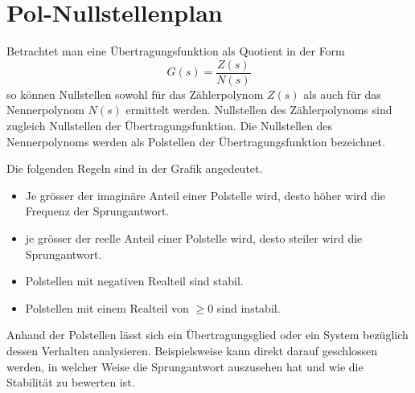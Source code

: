 \section{Pol-Nullstellenplan}
Betrachtet man eine Übertragungsfunktion als Quotient in der Form
\[  
    G(s) = \frac{Z(s)}{N(s)}
\]
so können Nullstellen sowohl für das Zählerpolynom $Z(s)$ als auch 
für das Nennerpolynom $N(s)$ ermittelt werden. Nullstellen des 
Zählerpolynoms sind zugleich Nullstellen der Übertragungsfunktion.
Die Nullstellen des Nennerpolynoms werden als Polstellen der
Übertragungsfunktion bezeichnet.
%
\begin{figure}[h!]
    \centering
\end{figure}
%
Die folgenden Regeln sind in der Grafik angedeutet.
\begin{itemize}
    \item Je grösser der imaginäre Anteil einer Polstelle wird, desto
        höher wird die Frequenz der Sprungantwort.
    \item je grösser der reelle Anteil einer Polstelle wird, desto
        steiler wird die Sprungantwort.
    \item Polstellen mit negativen Realteil sind stabil.
    \item Polstellen mit einem Realteil von $\geq 0$ sind instabil.
\end{itemize}
%
Anhand der Polstellen lässt sich ein Übertragungsglied oder ein System 
bezüglich dessen Verhalten analysieren. Beispielsweise kann direkt darauf
geschlossen werden, in welcher Weise die Sprungantwort auszusehen hat und
wie die Stabilität zu bewerten ist.
%
